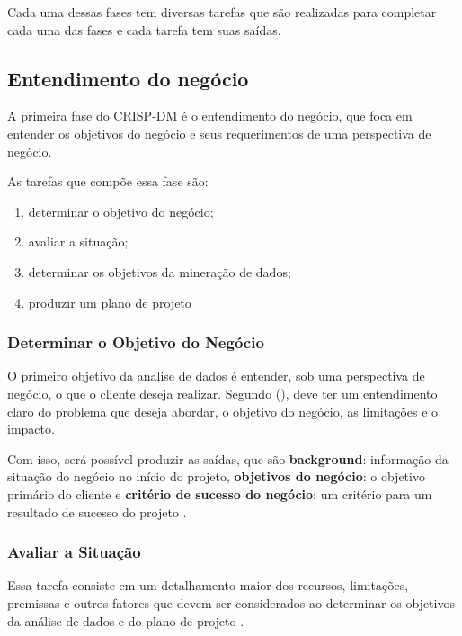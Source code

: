 Cada uma dessas fases tem diversas tarefas que são realizadas para completar cada uma das fases e cada tarefa tem suas saídas.

\subsection{Entendimento do negócio}
A primeira fase do CRISP-DM é o entendimento do negócio, que foca em entender os objetivos do negócio e seus requerimentos de uma perspectiva de negócio.

As tarefas que compõe essa fase são: 
\begin{enumerate}
    \item determinar o objetivo do negócio;
    \item avaliar a situação;
    \item determinar os objetivos da mineração de dados;
    \item produzir um plano de projeto
\end{enumerate}

\subsubsection{Determinar o Objetivo do Negócio}
O primeiro objetivo da analise de dados é entender, sob uma perspectiva de negócio, o que o cliente deseja realizar. Segundo \citeauthor{dmfd} (\citeyear[76]{dmfd}), deve ter um entendimento claro do problema que deseja abordar, o objetivo do negócio, as limitações e o impacto.

Com isso, será possível produzir as saídas, que são \textbf{background}: informação da situação do negócio no início do projeto, \textbf{objetivos do negócio}: o objetivo primário do cliente e \textbf{critério de sucesso do negócio}: um critério para um resultado de sucesso do projeto \citep[14]{crispmanual}.

\subsubsection{Avaliar a Situação}
Essa tarefa consiste em um detalhamento maior dos recursos, limitações, premissas e outros fatores que devem ser considerados ao determinar os objetivos da análise de dados e do plano de projeto \citep[14]{crispmanual}.

